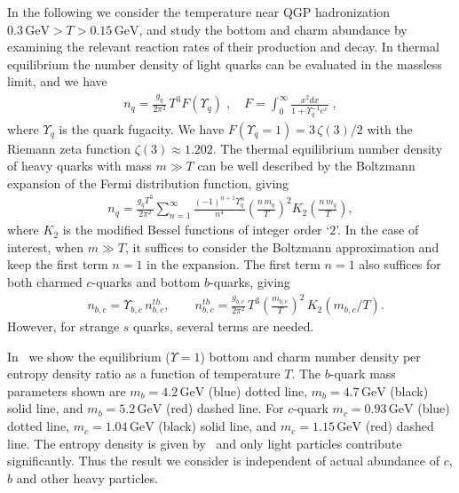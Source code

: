In the following we consider the temperature near QGP hadronization $0.3\,\mathrm{GeV}>T>0.15\,\mathrm{GeV}$, and study the bottom and charm abundance by examining the relevant reaction rates of their production and decay.
In thermal equilibrium the number density of light quarks can be evaluated in the massless limit, and we have
\begin{align}\label{FermiN}
n_q=\frac{g_{q}}{2\pi^2}\,T^3 F(\Upsilon_q)\;, \quad F=\int_0^\infty \frac{x^2dx}{1+\Upsilon_q^{-1}e^x}\;,
\end{align}
where $\Upsilon_q$ is the quark fugacity. We have $ F(\Upsilon_q=1)=3\,\zeta(3)/2$ with the Riemann zeta function $\zeta(3)\approx1.202$.
The thermal equilibrium number density of heavy quarks with mass $m\gg T$ can be well described by the Boltzmann expansion of the Fermi distribution function, giving
\begin{align}\label{BoltzN}
n_{q}\!=\!\frac{g_{q}T^3}{2\pi^2}\sum_{n=1}^{\infty}\frac{(-1)^{n+1}\Upsilon_q^n}{n^4}\left(\frac{n\,m_{q}}{T}\right)^{\!2}\!K_2\left(\frac{n\,m_{q}}{T}\right),
\end{align} 
where $K_2$ is the modified Bessel functions of integer order `$2$'. In the case of interest, when $m\gg T$, it suffices to consider the Boltzmann approximation and keep the first term $n=1$ in the expansion. The first term $n=1$ also suffices for both charmed $c$-quarks and bottom $b$-quarks, giving
\begin{align}
&n_{b,c}={\Upsilon_{b,c}\,}n^{th}_{b,c},\qquad n^{th}_{b,c}=\frac{g_{b,c}}{2\pi^2}\,T^3\left(\frac{m_{b,c}}{T}\right)^2\,K_2(m_{b,c}/T).
\end{align}
However, for strange $s$ quarks, several terms are needed. 

In~ we show the equilibrium ($\Upsilon=1$) bottom and charm number density per entropy density ratio as a function of temperature $T$. The $b$-quark mass parameters shown are $m_b=4.2\,\mathrm{GeV}$ (blue) dotted line, $m_b=4.7\,\mathrm{GeV}$ (black) solid line, and $m_b=5.2\,\mathrm{GeV}$ (red) dashed line. For $c$-quark $m_c=0.93\,\mathrm{GeV}$ (blue) dotted line, $m_c=1.04\,\mathrm{GeV}$ (black) solid line, and $m_c=1.15\,\mathrm{GeV}$ (red) dashed line. The entropy density is given by~ and only light particles contribute significantly. Thus the result we consider is independent of actual abundance of $c$, $b$ and other heavy particles. 


